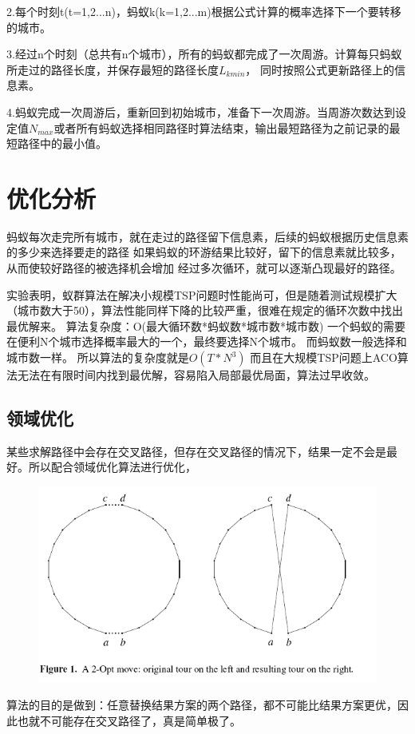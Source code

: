 \documentclass[12pt,nofonts]{ctexart}
\begin{document}
2.每个时刻t(t=1,2...n)，蚂蚁k(k=1,2...m)根据公式计算的概率选择下一个要转移的城市。

3.经过n个时刻（总共有n个城市），所有的蚂蚁都完成了一次周游。计算每只蚂蚁所走过的路径长度，并保存最短的路径长度$L_{kmin}$，
同时按照公式更新路径上的信息素。%

4.蚂蚁完成一次周游后，重新回到初始城市，准备下一次周游。当周游次数达到设定值$N_{max}$或者所有蚂蚁选择相同路径时算法结束，输出最短路径为之前记录的最短路径中的最小值。
\section{优化分析}

蚂蚁每次走完所有城市，就在走过的路径留下信息素，后续的蚂蚁根据历史信息素的多少来选择要走的路径
如果蚂蚁的环游结果比较好，留下的信息素就比较多，从而使较好路径的被选择机会增加
经过多次循环，就可以逐渐凸现最好的路径。

实验表明，蚁群算法在解决小规模TSP问题时性能尚可，但是随着测试规模扩大（城市数大于50），算法性能同样下降的比较严重，很难在规定的循环次数中找出最优解来。
算法复杂度：O(最大循环数*蚂蚁数*城市数*城市数)
一个蚂蚁的需要在便利N个城市选择概率最大的一个，最终要选择N个城市。
而蚂蚁数一般选择和城市数一样。
所以算法的复杂度就是$O(T*N^3)$
而且在大规模TSP问题上ACO算法无法在有限时间内找到最优解，容易陷入局部最优局面，算法过早收敛。
\subsection{领域优化}
某些求解路径中会存在交叉路径，但存在交叉路径的情况下，结果一定不会是最好。所以配合领域优化算法进行优化，
\begin{figure}[h]
\includegraphics[width=\textwidth,height=0.4\textheight]{opt.png}
\end{figure}
算法的目的是做到：任意替换结果方案的两个路径，都不可能比结果方案更优，因此也就不可能存在交叉路径了，真是简单极了。
\end{document}
